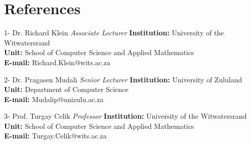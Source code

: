 \documentclass[letterpaper]{moderncv}        %
\begin{document}
\section{References}
\cventry
{1-}
{Dr. Richard Klein}
{}
{\textit{Associate Lecturer}}
{}
{\textbf{Institution:} University of the Witwatersrand\\
	\textbf{Unit:} School of Computer Science and Applied Mathematics\\
	\textbf{E-mail:} Richard.Klein@wits.ac.za}
\vspace{1mm}

\cventry
{2-}
{Dr. Pragasen Mudali}
{}
{\textit{Senior Lecturer}}
{}
{\textbf{Institution:} University of Zululand\\
	\textbf{Unit:} Department of Computer Science\\
	\textbf{E-mail:} Mudalip@unizulu.ac.za}
\vspace{1mm}

\cventry
{3-}
{Prof. Turgay Celik}
{}
{\textit{Professor}}
{}
{\textbf{Institution:} University of the Witwatersrand\\
	\textbf{Unit:} School of Computer Science and Applied Mathematics\\
	\textbf{E-mail:} Turgay.Celik@wits.ac.za}
\vspace{1mm}
\end{document}
